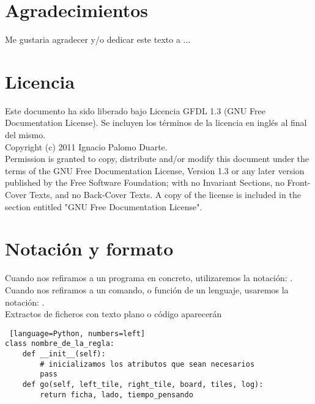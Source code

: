 

\section*{Agradecimientos}

Me gustaria agradecer y/o dedicar este texto a ...

\cleardoublepage

\section*{Licencia} %

Este documento ha sido liberado bajo Licencia GFDL 1.3 (GNU Free
Documentation License). Se incluyen los términos de la licencia en
inglés al final del mismo.\\

Copyright (c) 2011 Ignacio Palomo Duarte.\\

Permission is granted to copy, distribute and/or modify this document under the
terms of the GNU Free Documentation License, Version 1.3 or any later version
published by the Free Software Foundation; with no Invariant Sections, no
Front-Cover Texts, and no Back-Cover Texts. A copy of the license is included in
the section entitled "GNU Free Documentation License".\\

\cleardoublepage

\section*{Notación y formato}

Cuando nos refiramos a un programa en concreto, utilizaremos la
notación: .\\

Cuando nos refiramos a un comando, o función de un lenguaje, usaremos
la notación: .\\

Extractos de ficheros con texto plano o código aparecerán

\begin{lstlisting} [language=Python, numbers=left]
class nombre_de_la_regla:
    def __init__(self):
        # inicializamos los atributos que sean necesarios
        pass
    def go(self, left_tile, right_tile, board, tiles, log):
        return ficha, lado, tiempo_pensando
\end{lstlisting}
